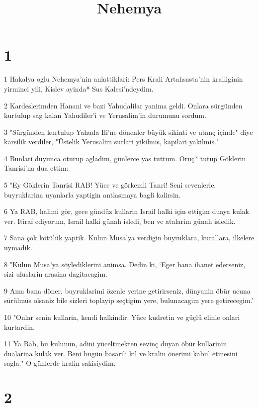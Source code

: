 

\title{Nehemya}


\chapter{1}

\par 1 Hakalya oglu Nehemya'nin anlattiklari: Pers Krali Artahsasta'nin kralliginin yirminci yili, Kislev ayinda* Sus Kalesi'ndeydim.
\par 2 Kardeslerimden Hanani ve bazi Yahudalilar yanima geldi. Onlara sürgünden kurtulup sag kalan Yahudiler'i ve Yerusalim'in durumunu sordum.
\par 3 "Sürgünden kurtulup Yahuda Ili'ne dönenler büyük sikinti ve utanç içinde" diye karsilik verdiler, "Üstelik Yerusalim surlari yikilmis, kapilari yakilmis."
\par 4 Bunlari duyunca oturup agladim, günlerce yas tuttum. Oruç* tutup Göklerin Tanrisi'na dua ettim:
\par 5 "Ey Göklerin Tanrisi RAB! Yüce ve görkemli Tanri! Seni sevenlerle, buyruklarina uyanlarla yaptigin antlasmaya bagli kalirsin.
\par 6 Ya RAB, halimi gör, gece gündüz kullarin Israil halki için ettigim duaya kulak ver. Itiraf ediyorum, Israil halki günah isledi, ben ve atalarim günah isledik.
\par 7 Sana çok kötülük yaptik. Kulun Musa'ya verdigin buyruklara, kurallara, ilkelere uymadik.
\par 8 "Kulun Musa'ya söylediklerini animsa. Dedin ki, `Eger bana ihanet ederseniz, sizi uluslarin arasina dagitacagim.
\par 9 Ama bana döner, buyruklarimi özenle yerine getirirseniz, dünyanin öbür ucuna sürülmüs olsaniz bile sizleri toplayip seçtigim yere, bulunacagim yere getirecegim.'
\par 10 "Onlar senin kullarin, kendi halkindir. Yüce kudretin ve güçlü elinle onlari kurtardin.
\par 11 Ya Rab, bu kulunun, adini yüceltmekten sevinç duyan öbür kullarinin dualarina kulak ver. Beni bugün basarili kil ve kralin önerimi kabul etmesini sagla." O günlerde kralin sakisiydim.

\chapter{2}

